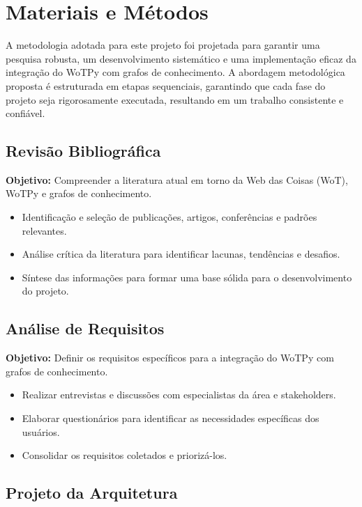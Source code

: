 \chapter{Materiais e Métodos}

A metodologia adotada para este projeto foi projetada para garantir uma pesquisa robusta, um desenvolvimento sistemático e uma implementação eficaz da integração do WoTPy com grafos de conhecimento. A abordagem metodológica proposta é estruturada em etapas sequenciais, garantindo que cada fase do projeto seja rigorosamente executada, resultando em um trabalho consistente e confiável.

\section{Revisão Bibliográfica}

\textbf{Objetivo:} Compreender a literatura atual em torno da Web das Coisas (WoT), WoTPy e grafos de conhecimento.

\begin{itemize}
\item Identificação e seleção de publicações, artigos, conferências e padrões relevantes.
\item Análise crítica da literatura para identificar lacunas, tendências e desafios.
\item Síntese das informações para formar uma base sólida para o desenvolvimento do projeto.
\end{itemize}

\section{Análise de Requisitos}

\textbf{Objetivo:} Definir os requisitos específicos para a integração do WoTPy com grafos de conhecimento.

\begin{itemize}
\item Realizar entrevistas e discussões com especialistas da área e stakeholders.
\item Elaborar questionários para identificar as necessidades específicas dos usuários.
\item Consolidar os requisitos coletados e priorizá-los.
\end{itemize}

\section{Projeto da Arquitetura}


